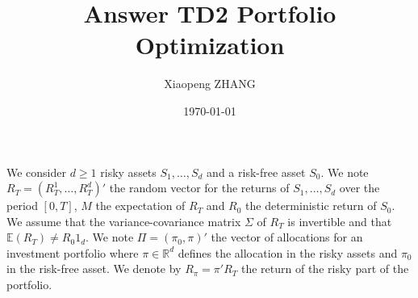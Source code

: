 \documentclass[a4paper, 12pt]{article}
\begin{document}
    \title{Answer TD2 Portfolio Optimization}
    \author{Xiaopeng ZHANG}
    \date{\today}
    \maketitle

    \setcounter{section}{2}

    We consider $d \geq 1$ risky assets $S_1, \ldots, S_d$ and a risk-free asset $S_0$.
    We note $R_T = (R_T^1, \ldots, R_T^d)'$ the random vector for the returns of $S_1, \ldots, S_d$ over the period $[0,T]$, $M$ the expectation of $R_T$ and $R_0$ the deterministic return of $S_0$.  
    We assume that the variance-covariance matrix $\Sigma$ of $R_T$ is invertible and that $\mathbb{E}(R_T) \neq R_0 1_d$.  
    We note $\Pi = (\pi_0, \pi)'$ the vector of allocations for an investment portfolio where $\pi \in \mathbb{R}^d$ defines the allocation in the risky assets and $\pi_0$ in the risk-free asset.
    We denote by $R_\pi = \pi'R_T$ the return of the risky part of the portfolio.


    

    
\end{document}

